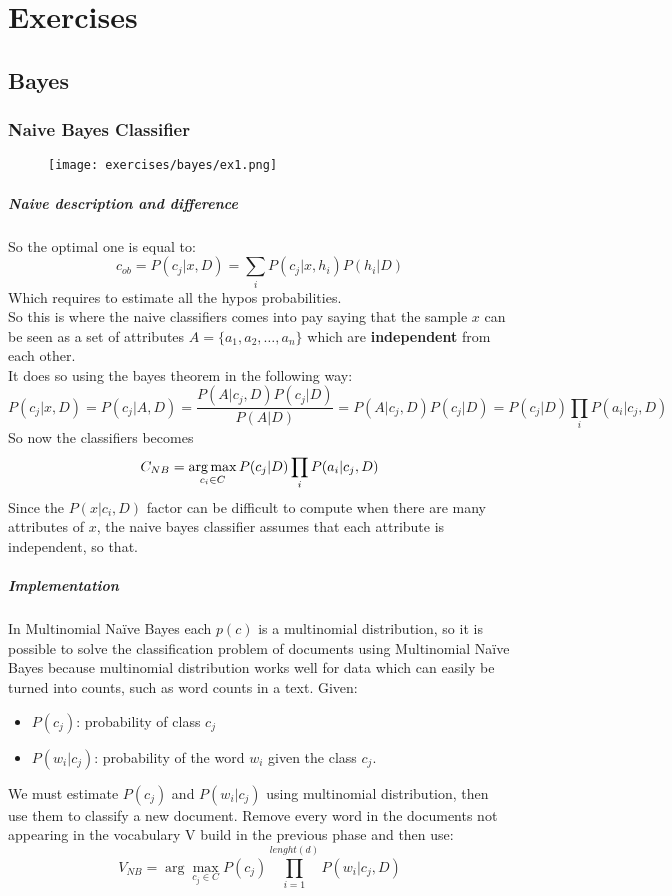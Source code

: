 
\newcommand{\argmaxs}[2]{\arg \max_{#2}{#1}}

\chapter{Exercises}

\section{Bayes}

\subsection{Naive Bayes Classifier}

\begin{figure}[H]
    \centering
   \texttt{[image: exercises/bayes/ex1.png]}
\end{figure}


\paragraph{Naive description and difference}
So the optimal one is equal to:
$$c_{ob}=P(c_j|x,D)=\sum_i P(c_j|x,h_i)P(h_i|D)$$
Which requires to estimate all the hypos probabilities.\\
So this is where the naive classifiers comes into pay saying that the sample $x$ can be seen as a set of attributes $A=\{a_1,a_2,\dots, a_n\}$ which are \textbf{independent} from each other.\\
It does so using the  bayes theorem in the following way:
$$P(c_j|x,D)=P(c_j|A,D)=\frac{P(A|c_j,D)P(c_j|D)}{P(A|D)}=P(A|c_j,D)P(c_j|D)=P(c_j|D)\prod_i P(a_i|c_j,D)$$
So now the classifiers becomes
$$C_{NB}=\operatorname*{arg\,max}_{c_i \in C}P(c_j|D)\prod_i P(a_i|c_j,D)$$
Since the $P(x| c_i,D)$ factor can be difficult to compute when there are many attributes of $x$, the naive bayes classifier assumes that each attribute is independent, so that.

\paragraph{Implementation }
In Multinomial Naïve Bayes each $p(c)$ is a multinomial distribution, so it is possible to solve the classification problem of documents using Multinomial Naïve Bayes because multinomial distribution works well for data which can easily be turned into counts, such as word counts in a text.
Given:
\begin{itemize}
\item $P(c_j)$: probability of class $c_j$
\item $P(w_i|c_j)$: probability of the word $w_i$ given the class $c_j$.
\end{itemize}
We must estimate $P(c_j)$ and $P(w_i|c_j)$ using multinomial distribution, then use them to classify a new document. Remove every word in the documents not appearing in the vocabulary V build in the previous phase and then use:
\[V_{NB}=\argmaxs{P(c_j)\prod_{i=1}^{lenght(d)}P(w_i|c_j,D)}{c_j \in C}\]



